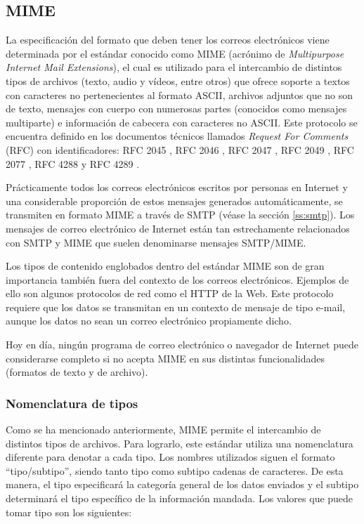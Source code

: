 \subsection{MIME}\label{ss:mime}
La especificación del formato que deben tener los correos electrónicos viene determinada por el estándar conocido como MIME (acrónimo de \textit{Multipurpose Internet Mail Extensions}), el cual es utilizado para el intercambio de distintos tipos de archivos (texto, audio y vídeos, entre otros) que ofrece soporte a textos con caracteres no pertenecientes al formato ASCII, archivos adjuntos que no son de texto, mensajes con cuerpo con numerosas partes (conocidos como mensajes multiparte) e información de cabecera con caracteres no ASCII. Este protocolo se encuentra definido en los documentos técnicos llamados \textit{Request For Comments} (RFC) con identificadores: RFC 2045 \citep{rfc2045}, RFC 2046 \citep{rfc2046}, RFC 2047 \citep{rfc2047}, RFC 2049 \citep{rfc2049}, RFC 2077 \citep{rfc2077}, RFC 4288 \citep{rfc4288} y RFC 4289 \citep{rfc4289}.

Prácticamente todos los correos electrónicos escritos por personas en Internet y una considerable proporción de estos mensajes generados automáticamente, se transmiten en formato MIME a través de SMTP (véase la sección \ref{ss:smtp}). Los mensajes de correo electrónico de Internet están tan estrechamente relacionados con SMTP y MIME que suelen denominarse mensajes SMTP/MIME.

Los tipos de contenido englobados dentro del estándar MIME son de gran importancia también fuera del contexto de los correos electrónicos. Ejemplos de ello son algunos protocolos de red como el HTTP de la Web. Este protocolo requiere que los datos se transmitan en un contexto de mensaje de tipo e-mail, aunque los datos no sean un correo electrónico propiamente dicho.

Hoy en día, ningún programa de correo electrónico o navegador de Internet puede considerarse completo si no acepta MIME en sus distintas funcionalidades (formatos de texto y de archivo).

\subsubsection{Nomenclatura de tipos}\label{sss:mimetipos}
Como se ha mencionado anteriormente, MIME permite el intercambio de distintos tipos de archivos. Para lograrlo, este estándar utiliza una nomenclatura diferente para denotar a cada tipo. Los nombres utilizados siguen el formato ``tipo/subtipo'', siendo tanto tipo como subtipo cadenas de caracteres. De esta manera, el tipo especificará la categoría general de los datos enviados y el subtipo determinará el tipo específico de la información mandada. Los valores que puede tomar tipo son los siguientes:

